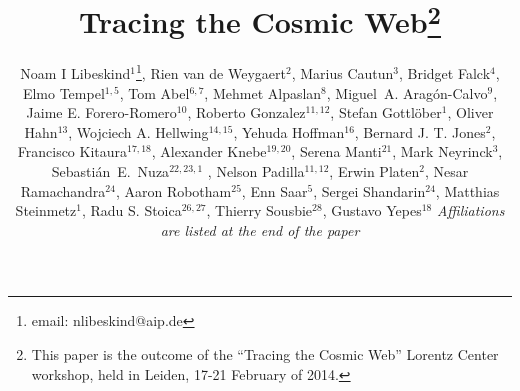 \documentclass[useAMS,usenatbib]{mnras}
\newcommand{\mc}[1]{\textcolor{red}{\bf #1}}
\begin{document}
\title[Tracing the Cosmic Web]{{Tracing the Cosmic Web}\mc{}\thanks{This paper is the outcome of the ``Tracing the Cosmic Web'' Lorentz Center workshop, held in Leiden, 17-21 February of 2014.}}
\author[Libeskind et al.]
{\parbox{\textwidth}{Noam I Libeskind$^{1}$\thanks{email: nlibeskind@aip.de}, Rien van de Weygaert$^{2}$, Marius Cautun$^{3}$, Bridget Falck$^{4}$, Elmo Tempel$^{1,5}$, Tom Abel$^{6,7}$, Mehmet Alpaslan$^{8}$, Miguel~A. Arag\'on-Calvo$^{9}$, Jaime E. Forero-Romero$^{10}$, Roberto Gonzalez$^{11,12}$, Stefan Gottl\"{o}ber$^{1}$, Oliver Hahn$^{13}$, Wojciech A. Hellwing$^{14,15}$, Yehuda Hoffman$^{16}$, Bernard J. T. Jones$^{2}$, Francisco Kitaura$^{17,18}$, Alexander Knebe$^{19,20}$, Serena Manti$^{21}$, Mark Neyrinck$^{3}$, Sebasti\'an~E.~Nuza$^{22,23,1}$ 
, Nelson Padilla$^{11,12}$, Erwin Platen$^{2}$,  Nesar Ramachandra$^{24}$,  Aaron Robotham$^{25}$, Enn Saar$^{5}$, Sergei Shandarin$^{24}$, Matthias Steinmetz$^{1}$, Radu S. Stoica$^{26,27}$, Thierry Sousbie$^{28}$, Gustavo Yepes$^{18}$\newline
\emph{\normalsize Affiliations are listed at the end of the paper}}}

%

\maketitle
\end{document}
